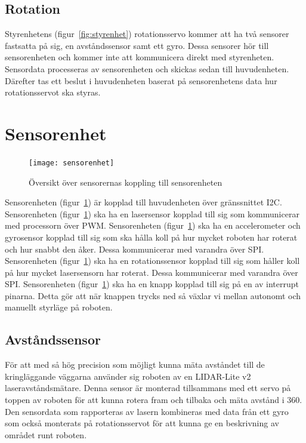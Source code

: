 \documentclass{article}
\begin{document}
\subsection{Rotation}
Styrenhetens (figur~\ref{fig:styrenhet}) rotationsservo kommer att ha två sensorer fastsatta på sig, en avståndssensor samt ett gyro. Dessa sensorer hör till sensorenheten och kommer inte att kommunicera direkt med styrenheten. Sensordata processeras av sensorenheten och skickas sedan till huvudenheten. Därefter tas ett beslut i huvudenheten baserat på sensorenhetens data hur rotationsservot ska styras. 


\section{Sensorenhet}

\begin{figure}[H]
\centering
\texttt{[image: sensorenhet]}
\caption{Översikt över sensorernas koppling till sensorenheten}
\label{fig:sensorenhet}
\end{figure}
Sensorenheten (figur~\ref{fig:sensorenhet}) är kopplad till huvudenheten över gränssnittet I2C.\newline\newline
Sensorenheten (figur~\ref{fig:sensorenhet}) ska ha en lasersensor kopplad till sig som kommunicerar med processorn över PWM.\newline\newline
Sensorenheten (figur~\ref{fig:sensorenhet}) ska ha en accelerometer och gyrosensor kopplad till sig som ska hålla koll på hur mycket roboten har roterat och hur snabbt den åker. Dessa kommunicerar med varandra över SPI. \newline\newline
Sensorenheten (figur~\ref{fig:sensorenhet}) ska ha en rotationssensor kopplad till sig som håller koll på hur mycket lasersensorn har roterat. Dessa kommunicerar med varandra över SPI. \newline\newline
Sensorenheten (figur~\ref{fig:sensorenhet}) ska ha en knapp kopplad till sig på en av interrupt pinarna. Detta gör att när knappen trycks ned så växlar vi mellan autonomt och manuellt styrläge på roboten. \newline\newline

\subsection{Avståndssensor}
För att med så hög precision som möjligt kunna mäta avståndet till de kringläggande väggarna använder sig roboten av en LIDAR-Lite v2 laseravståndsmätare. Denna sensor är monterad tillsammans med ett servo på toppen av roboten för att kunna rotera fram och tilbaka och mäta avstånd i 360\textdegree. Den sensordata som rapporteras av lasern kombineras med data från ett gyro som också monterats på rotationsservot för att kunna ge en beskrivning av området runt roboten.
\end{document}
